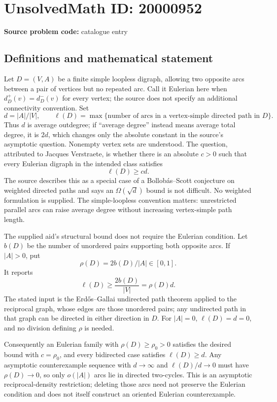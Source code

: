 \documentclass[11pt]{article}
\begin{document}
\section*{UnsolvedMath ID: 20000952}
\textbf{Source problem code:} catalogue entry
\subsection{Definitions and mathematical statement}
Let \(D=(V,A)\) be a finite simple loopless digraph, allowing two opposite arcs between a pair of vertices but no repeated arc. Call it Eulerian here when \(d_D^+(v)=d_D^-(v)\) for every vertex; the source does not specify an additional connectivity convention. Set
\[
 d=|A|/|V|,
 \qquad \ell(D)=\max\{\text{number of arcs in a vertex-simple directed path in }D\}.
\]
Thus \(d\) is average outdegree; if ``average degree'' instead means average total degree, it is \(2d\), which changes only the absolute constant in the source's asymptotic question. Nonempty vertex sets are understood. The question, attributed to Jacques Verstraete, is whether there is an absolute \(c>0\) such that every Eulerian digraph in the intended class satisfies
\[
 \ell(D)\ge cd.
\]
The source describes this as a special case of a Bollob\'as--Scott conjecture on weighted directed paths and says an \(\Omega(\sqrt d)\) bound is not difficult. No weighted formulation is supplied. The simple-loopless convention matters: unrestricted parallel arcs can raise average degree without increasing vertex-simple path length.

The supplied aid's structural bound does not require the Eulerian condition. Let \(b(D)\) be the number of unordered pairs supporting both opposite arcs. If \(|A|>0\), put
\[
 \rho(D)=2b(D)/|A|\in[0,1].
\]
It reports
\[
 \ell(D)\ge\frac{2b(D)}{|V|}=\rho(D)d.
\]
The stated input is the Erd\H{o}s--Gallai undirected path theorem applied to the reciprocal graph, whose edges are those unordered pairs; any undirected path in that graph can be directed in either direction in \(D\). For \(|A|=0\), \(\ell(D)=d=0\), and no division defining \(\rho\) is needed.

Consequently an Eulerian family with \(\rho(D)\ge\rho_0>0\) satisfies the desired bound with \(c=\rho_0\), and every bidirected case satisfies \(\ell(D)\ge d\). Any asymptotic counterexample sequence with \(d\to\infty\) and \(\ell(D)/d\to0\) must have \(\rho(D)\to0\), so only \(o(|A|)\) arcs lie in directed two-cycles. This is an asymptotic reciprocal-density restriction; deleting those arcs need not preserve the Eulerian condition and does not itself construct an oriented Eulerian counterexample.
\end{document}
